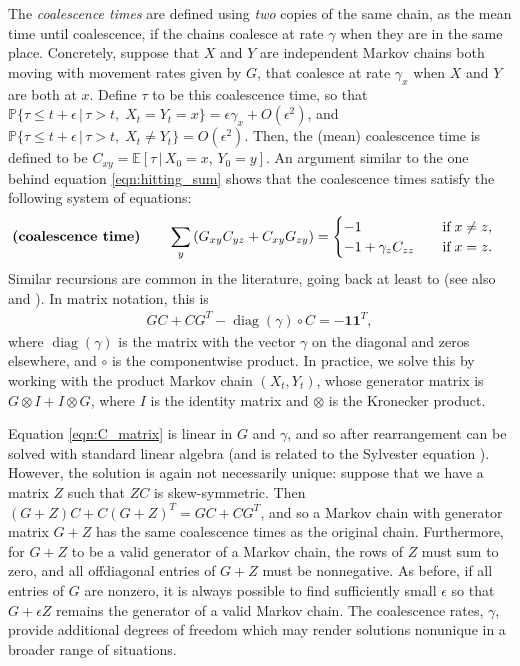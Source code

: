 \documentclass{article}
\DeclareMathOperator{\diag}{\mathop{\mbox{diag}}}
\renewcommand{\P}{\mathbb{P}}
\newcommand{\E}{\mathbb{E}}
\newcommand{\given}{\,\vert\,}
\newcommand{\bone}{\mathbf{1}}
\begin{document}
The \emph{coalescence times} are defined using \emph{two} copies of the same chain,
as the mean time until coalescence,
if the chains coalesce at rate $\gamma$ when they are in the same place.
Concretely, 
suppose that $X$ and $Y$ are independent Markov chains both moving with movement rates given by $G$,
that coalesce at rate $\gamma_x$ when $X$ and $Y$ are both at $x$.
Define $\tau$ to be this coalescence time,
so that 
$\P\{\tau \le t + \epsilon \given \tau > t, \; X_t = Y_t = x\} = \epsilon \gamma_x + O(\epsilon^2)$,
and 
$\P\{\tau \le t + \epsilon \given \tau > t, \; X_t \neq Y_t\} = O(\epsilon^2)$.
Then, the (mean) coalescence time is defined to be
$C_{xy} = \E[\tau \given X_0 = x, \, Y_0 = y]$.
An argument similar to the one behind equation \eqref{eqn:hitting_sum}
shows that the coalescence times satisfy the following system of equations:
\begin{align}
\text{\bf (coalescence time)} \qquad
    \sum_y \left(G_{xy} C_{yz} + C_{xy} G_{zy}\right)
    &=
    \begin{cases}
        -1                   \quad & \text{if} \; x \neq z, \\
        -1 + \gamma_z C_{zz} \quad & \text{if} \; x = z.
    \end{cases}
\end{align}
Similar recursions are common in the literature,
going back at least to \citet{hill1972effective} 
(see also \citet{tufto1998analysis} and \citet{whitlock1997effective}).
In matrix notation, this is
\begin{align} \label{eqn:C_matrix}
    G C + C G^T - \diag(\gamma) \circ C = -\bone \bone^T,
\end{align}
where $\diag(\gamma)$ is the matrix with the vector $\gamma$ on the diagonal and zeros elsewhere,
and $\circ$ is the componentwise product.
In practice, we solve this by working with the product Markov chain $(X_t, Y_t)$,
whose generator matrix is $G \otimes I + I \otimes G$, 
where $I$ is the identity matrix and $\otimes$ is the Kronecker product.

Equation \eqref{eqn:C_matrix} is linear in $G$ and $\gamma$,
and so after rearrangement can be solved with standard linear algebra
(and is related to the Sylvester equation \citep{bhatia1997solve}).
However, the solution is again not necessarily unique:
suppose that we have a matrix $Z$ such that $ZC$ is skew-symmetric.
Then $(G + Z) C + C (G + Z)^T = GC + CG^T$,
and so a Markov chain with generator matrix $G + Z$ has the same coalescence times
as the original chain.
Furthermore, for $G + Z$ to be a valid generator of a Markov chain,
the rows of $Z$ must sum to zero,
and all offdiagonal entries of $G + Z$ must be nonnegative. 
As before, if all entries of $G$ are nonzero, 
it is always possible to find sufficiently small $\epsilon$
so that $G + \epsilon Z$ remains the generator of a valid Markov chain.
The coalescence rates, $\gamma$, provide additional degrees of freedom
which may render solutions nonunique in a broader range of situations.
\end{document}
